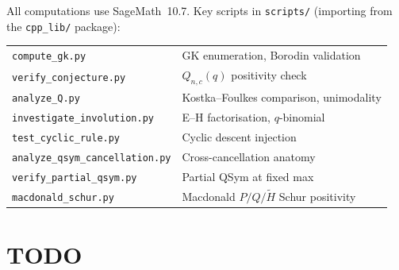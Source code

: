 \documentclass[11pt]{article}
\theoremstyle{plain}
\theoremstyle{definition}
\theoremstyle{remark}
\begin{document}
All computations use SageMath~10.7. Key scripts in
\texttt{scripts/} (importing from the \texttt{cpp\_lib/} package):

\begin{center}
\begin{tabular}{ll}
\texttt{compute\_gk.py} & GK enumeration, Borodin validation \\
\texttt{verify\_conjecture.py} & $Q_{n,c}(q)$ positivity check \\
\texttt{analyze\_Q.py} & Kostka--Foulkes comparison, unimodality \\
\texttt{investigate\_involution.py} & E--H factorisation, $q$-binomial \\
\texttt{test\_cyclic\_rule.py} & Cyclic descent injection \\
\texttt{analyze\_qsym\_cancellation.py} & Cross-cancellation anatomy \\
\texttt{verify\_partial\_qsym.py} & Partial QSym at fixed max \\
\texttt{macdonald\_schur.py} & Macdonald $P/Q/\tilde{H}$ Schur positivity \\
\end{tabular}
\end{center}

\section*{TODO}
\end{document}
